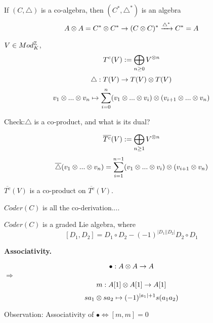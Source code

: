 \begin{rem}
If $(C,\triangle)$ is a co-algebra, then
$(C^*,\triangle^*)$ is an algebra
$$A\otimes A=C^*\otimes C^*\to(C\otimes C)^*\xrightarrow{\triangle^*}C^*=A$$
\end{rem}

\begin{example}
$V\in Mod_K^{\mathbb{Z}}$, 
$$T^c(V):=\bigoplus_{n\geq 0}V^{\otimes n}$$
$$\triangle:T(V)\to T(V)\otimes T(V)$$
$$v_1\otimes...\otimes v_n\mapsto
\sum_{i=0}^n(v_1\otimes...\otimes v_i)\otimes(v_{i+1}\otimes...\otimes v_n)$$
\end{example}

Check:$\triangle$ is a co-product, and what is its dual?

\begin{example}
$$\overline{T^c}(V):=\bigoplus_{n\geq 1}V^{\otimes n}$$
$$\overline{\triangle}(v_1\otimes...\otimes v_n)
=
\sum_{i=1}^{n-1}(v_1\otimes...\otimes v_i)\otimes(v_{i+1}\otimes v_n)$$

$\overline{T^c}(V)$ is a co-product on $\overline{T^c}(V)$.
\end{example}

$Coder(C)$ is all the co-derivation....

\begin{prop}
$Coder(C)$ is a graded Lie algebra, where
$$[D_1,D_2]=D_1\circ D_2-(-1)^{|D_1||D_2|}D_2\circ D_1$$
\end{prop}

\textbf{Associativity.}

$$\bullet:A\otimes A\to A$$
$\Longrightarrow$
$$m:A[1]\otimes A[1]\to A[1]$$
$$sa_1\otimes sa_2\mapsto(-1)^{|a_1|+1}s(a_1a_2)$$

Observation:
Associativity of $\bullet\Longleftrightarrow[m,m]=0$








